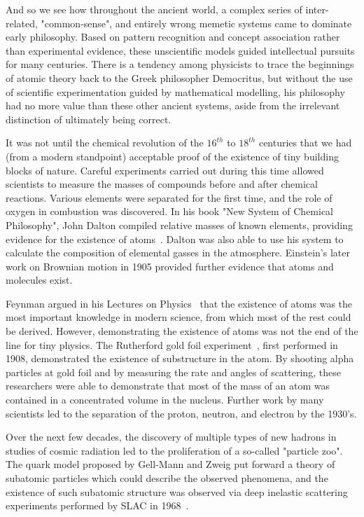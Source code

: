 And so we see how throughout the ancient world, a complex series of inter-related, "common-sense", and entirely wrong memetic systems came to dominate early philosophy. Based on pattern recognition and concept association rather than experimental evidence, these unscientific models guided intellectual pursuits for many centuries. There is a tendency among physicists to trace the beginnings of atomic theory back to the Greek philosopher Democritus, but without the use of scientific experimentation guided by mathematical modelling, his philosophy had no more value than these other ancient systems, aside from the irrelevant distinction of ultimately being correct.

It was not until the chemical revolution of the $16^{th}$ to $18^{th}$ centuries that we had (from a modern standpoint) acceptable proof of the existence of tiny building blocks of nature. Careful experiments carried out during this time allowed scientists to measure the masses of compounds before and after chemical reactions. Various elements were separated for the first time, and the role of oxygen in combustion was discovered. In his book "New System of Chemical Philosophy", John Dalton compiled relative masses of known elements, providing evidence for the existence of atoms~\cite{new_system_chemical}. Dalton was also able to use his system to calculate the composition of elemental gasses in the atmosphere. Einstein's later work on Brownian motion in 1905 provided further evidence that atoms and molecules exist.

Feynman argued in his Lectures on Physics~\cite{feynman1965flp} that the existence of atoms was the most important knowledge in modern science, from which most of the rest could be derived. However, demonstrating the existence of atoms was not the end of the line for tiny physics. The Rutherford gold foil experiment~\cite{Rutherford}, first performed in 1908, demonstrated the existence of substructure in the atom. By shooting alpha particles at gold foil and by measuring the rate and angles of scattering, these researchers were able to demonstrate that most of the mass of an atom was contained in a concentrated volume in the nucleus. Further work by many scientists led to the separation of the proton, neutron, and electron by the 1930's.

Over the next few decades, the discovery of multiple types of new hadrons in studies of cosmic radiation led to the proliferation of a so-called "particle zoo". The quark model proposed by Gell-Mann and Zweig put forward a theory of subatomic particles which could describe the observed phenomena, and the existence of such subatomic structure was observed via deep inelastic scattering experiments performed by SLAC in 1968~\cite{SLAC_quark}.

